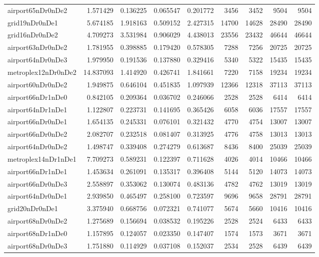 \begin{longtable}{|l|r|r|r|r|r|r|r|r|}
airport65nDr0nDe2 & 1.571429 & 0.136225 & 0.065547 & 0.201772 & 3456 & 3452 & 9504 & 9504 \\
grid19nDr0nDe1 & 5.674185 & 1.918163 & 0.509152 & 2.427315 & 14700 & 14628 & 28490 & 28490 \\
grid16nDr0nDe2 & 4.709273 & 3.531984 & 0.906029 & 4.438013 & 23556 & 23432 & 46644 & 46644 \\
airport63nDr0nDe2 & 1.781955 & 0.398885 & 0.179420 & 0.578305 & 7288 & 7256 & 20725 & 20725 \\
airport64nDr0nDe3 & 1.979950 & 0.191536 & 0.137880 & 0.329416 & 5340 & 5322 & 15435 & 15435 \\
metroplex12nDr0nDe2 & 14.837093 & 1.414920 & 0.426741 & 1.841661 & 7220 & 7158 & 19234 & 19234 \\
airport60nDr0nDe2 & 1.949875 & 0.646104 & 0.451835 & 1.097939 & 12366 & 12318 & 37113 & 37113 \\
airport66nDr1nDe0 & 0.842105 & 0.209364 & 0.036702 & 0.246066 & 2528 & 2528 & 6414 & 6414 \\
airport64nDr1nDe1 & 1.122807 & 0.223731 & 0.141695 & 0.365426 & 6058 & 6036 & 17557 & 17557 \\
airport66nDr0nDe1 & 1.654135 & 0.245331 & 0.076101 & 0.321432 & 4770 & 4754 & 13007 & 13007 \\
airport66nDr0nDe2 & 2.082707 & 0.232518 & 0.081407 & 0.313925 & 4776 & 4758 & 13013 & 13013 \\
airport64nDr0nDe2 & 1.498747 & 0.339408 & 0.274279 & 0.613687 & 8436 & 8400 & 25039 & 25039 \\
metroplex14nDr1nDe1 & 7.709273 & 0.589231 & 0.122397 & 0.711628 & 4026 & 4014 & 10466 & 10466 \\
airport66nDr1nDe1 & 1.453634 & 0.261091 & 0.135317 & 0.396408 & 5144 & 5120 & 14073 & 14073 \\
airport66nDr0nDe3 & 2.558897 & 0.353062 & 0.130074 & 0.483136 & 4782 & 4762 & 13019 & 13019 \\
airport64nDr0nDe1 & 2.939850 & 0.465497 & 0.258100 & 0.723597 & 9696 & 9658 & 28791 & 28791 \\
grid20nDr0nDe1 & 3.375940 & 0.668756 & 0.072321 & 0.741077 & 5674 & 5660 & 10416 & 10416 \\
airport68nDr0nDe2 & 1.275689 & 0.156694 & 0.038532 & 0.195226 & 2528 & 2524 & 6433 & 6433 \\
airport68nDr1nDe0 & 1.157895 & 0.124057 & 0.023350 & 0.147407 & 1574 & 1573 & 3671 & 3671 \\
airport68nDr0nDe3 & 1.751880 & 0.114929 & 0.037108 & 0.152037 & 2534 & 2528 & 6439 & 6439 \\

\end{longtable}
